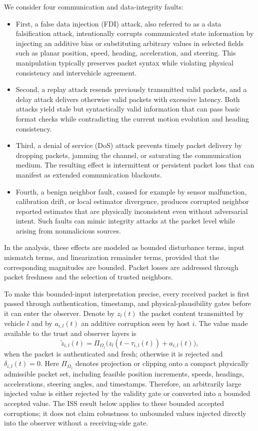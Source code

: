 \documentclass[letterpaper,journal]{IEEEtran}
\begin{document}
We consider four communication and data-integrity faults:
\begin{itemize}
    \item First, a false data injection (FDI) attack, also referred to as a data falsification attack, intentionally corrupts communicated state information by injecting an additive bias or substituting arbitrary values in selected fields such as planar position, speed, heading, acceleration, and steering. This manipulation typically preserves packet syntax while violating physical consistency and intervehicle agreement.
    \item Second, a replay attack resends previously transmitted valid packets, and a delay attack delivers otherwise valid packets with excessive latency. Both attacks yield stale but syntactically valid information that can pass basic format checks while contradicting the current motion evolution and heading consistency.
    \item Third, a denial of service (DoS) attack prevents timely packet delivery by dropping packets, jamming the channel, or saturating the communication medium. The resulting effect is intermittent or persistent packet loss that can manifest as extended communication blackouts.
    \item Fourth, a benign neighbor fault, caused for example by sensor malfunction, calibration drift, or local estimator divergence, produces corrupted neighbor reported estimates that are physically inconsistent even without adversarial intent. Such faults can mimic integrity attacks at the packet level while arising from nonmalicious sources.
\end{itemize}
In the analysis, these effects are modeled as bounded disturbance terms, input mismatch terms, and linearization remainder terms, provided that the corresponding magnitudes are bounded. Packet losses are addressed through packet freshness and the selection of trusted neighbors.

To make this bounded-input interpretation precise, every received packet is first passed through authentication, timestamp, and physical-plausibility gates before it can enter the observer. Denote by $z_l(t)$ the packet content transmitted by vehicle $l$ and by $a_{i,l}(t)$ an additive corruption seen by host $i$. The value made available to the trust and observer layers is
\begin{equation}
    \tilde z_{i,l}(t)
    =
    \Pi_{\Omega_z}\big(z_l(t-\tau_{i,l}(t))+a_{i,l}(t)\big),
    \label{eq_received_packet_gate}
\end{equation}
when the packet is authenticated and fresh; otherwise it is rejected and $\delta_{i,l}(t)=0$. Here $\Pi_{\Omega_z}$ denotes projection or clipping onto a compact physically admissible packet set, including feasible position increments, speeds, headings, accelerations, steering angles, and timestamps. Therefore, an arbitrarily large injected value is either rejected by the validity gate or converted into a bounded accepted value. The ISS result below applies to these bounded accepted corruptions; it does not claim robustness to unbounded values injected directly into the observer without a receiving-side gate.
\end{document}
